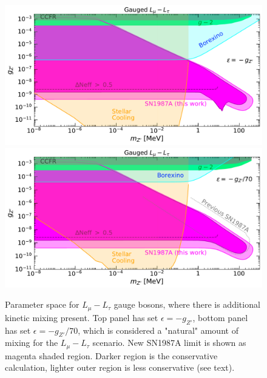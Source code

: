 \documentclass[11pt]{article}
\begin{document}
\begin{figure}[t!]
  \includegraphics[width=0.99\columnwidth]{full_SNbound_eps1} \vspace{3mm}\\ 
    \includegraphics[width=0.99\columnwidth]{full_SNbound_eps70} 
\caption{Parameter space for $L_\mu-L_\tau$ gauge bosons, where there is additional kinetic mixing present. Top panel has set $\epsilon=-g_{Z'}$, bottom panel has set $\epsilon=-g_{Z'}/70$, which is considered a "natural" amount of mixing for the $L_\mu-L_\tau$ scenario. New SN1987A limit is shown as magenta shaded region. Darker region is the conservative calculation, lighter outer region is less conservative (see text). }
\label{fig:lmultaueps}
\end{figure}
\end{document}
